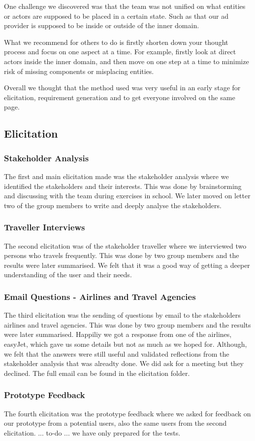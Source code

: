 One challenge we discovered was that the team was not unified on what entities or actors are supposed to be placed in a certain state. Such as that our ad provider is supposed to be inside or outside of the inner domain.

What we recommend for others to do is firstly shorten down your thought process and focus on one aspect at a time. For example, firstly look at direct actors inside the inner domain, and then move on one step at a time to minimize risk of missing components or misplacing entities.

Overall we thought that the method used was very useful in an early stage for elicitation, requirement generation and to get everyone involved on the same page.

\subsection{Elicitation}
\subsubsection{Stakeholder Analysis}
The first and main elicitation made was the stakeholder analysis where we identified the stakeholders and their interests. This was done by brainstorming and discussing with the team during exercises in school. We later moved on letter two of the group members to write and deeply analyse the stakeholders.

\subsubsection{Traveller Interviews}
The second elicitation was of the stakeholder traveller where we interviewed two persons who travels frequently. This was done by two group members and the results were later summarised. We felt that it was a good way of getting a deeper understanding of the user and their needs. 

\subsubsection{Email Questions - Airlines and Travel Agencies}
The third elicitation was the sending of questions by email to the stakeholders airlines and travel agencies. This was done by two group members and the results were later summarised. Happiliy we got a response from one of the airlines, easyJet, which gave us some details but not as much as we hoped for. Although, we felt that the answers were still useful and validated reflections from the stakeholder analysis that was alreadty done. We did ask for a meeting but they declined. The full email can be found in the elicitation folder.

\subsubsection{Prototype Feedback}
The fourth elicitation was the prototype feedback where we asked for feedback on our prototype from a potential users, also the same users from the second elicitation. 
... to-do ... we have only prepared for the tests.